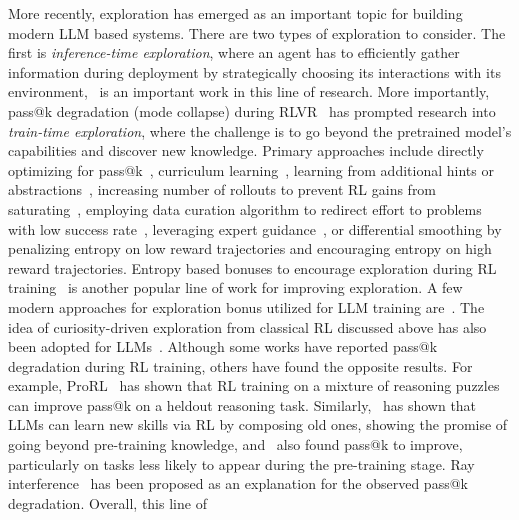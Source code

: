 \documentclass[10pt]{article} %
\begin{document}
More recently, exploration has emerged as an important topic for building modern LLM based systems. There are two types of exploration to consider. The first is \textit{inference-time exploration}, where an agent has to efficiently gather information during deployment by strategically choosing its interactions with its environment,~\citet{tajwar2025traininggenerallycuriousagent} is an important work in this line of research. More importantly, pass@k degradation (mode collapse) during RLVR~\citep{yue2025doesreinforcementlearningreally,wu2026invisibleleashrlvrescape,gxchen2025klregularizedreinforcementlearningdesigned} has prompted research into \textit{train-time exploration}, where the challenge is to go beyond the pretrained model's capabilities and discover new knowledge. Primary approaches include directly optimizing for pass@k~\citep{walder2025passkpolicyoptimizationsolving,tang2025optimizinglanguagemodelsinference,chen2025passktrainingadaptivelybalancing}, curriculum learning~\citep{tajwar2025traininggenerallycuriousagent,chen2025selfevolvingcurriculumllmreasoning,setlur2025e3learningexploreenables,motwani2025h1bootstrappingllmsreason}, learning from additional hints or abstractions~\citep{qu2025rladtrainingllmsdiscover,chen2025nudgingboundariesllmreasoning,anonymous2025exploratory}, increasing number of rollouts to prevent RL gains from saturating~\citep{hu2025brorlscalingreinforcementlearning}, employing data curation algorithm to redirect effort to problems with low success rate~\citep{nguyen2025reasoningboundaryparadoxreinforcement}, leveraging expert guidance~\citep{chang2024datasetresetpolicyoptimization,qu2025pope}, or differential smoothing by penalizing entropy on low reward trajectories and encouraging entropy on high reward trajectories. Entropy based bonuses to encourage exploration during RL training~\citep{hao2025rethinkingentropyinterventionsrlvr,chen2025explorationvsexploitationrethinking,cheng2025reasoningexplorationentropyperspective,wang2025beyond,anonymous2025entropypreserving,ged2024matryoshkapolicygradiententropyregularized} is another popular line of work for improving exploration. A few modern approaches for exploration bonus utilized for LLM training are~\citet{song2025outcomebasedexplorationllmreasoning,tuyls2025representationbasedexplorationlanguagemodels}. The idea of curiosity-driven exploration from classical RL discussed above has also been adopted for LLMs~\citep{dai2025cdecuriositydrivenexplorationefficient}. Although some works have reported pass@k degradation during RL training, others have found the opposite results. For example, ProRL~\citep{liu2025prorlprolongedreinforcementlearning} has shown that RL training on a mixture of reasoning puzzles~\citep{stojanovski2025reasoninggymreasoningenvironments} can improve pass@k on a heldout reasoning task. Similarly,~\citet{yuan2025fxgxfgxllms} has shown that LLMs can learn new skills via RL by composing old ones, showing the promise of going beyond pre-training knowledge, and~\citet{cheng2025revisitingreinforcementlearningllm} also found pass@k to improve, particularly on tasks less likely to appear during the pre-training stage. Ray interference~\citep{schaul2019rayinterferencesourceplateaus} has been proposed as an explanation for the observed pass@k degradation. Overall, this line of 
\end{document}
